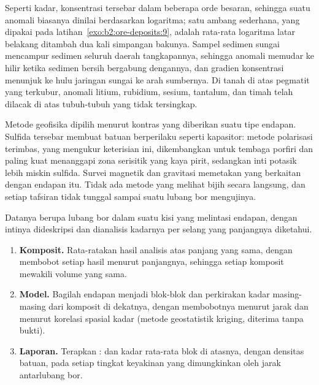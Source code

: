 Seperti kadar, konsentrasi tersebar dalam beberapa orde besaran, sehingga suatu anomali biasanya dinilai berdasarkan
logaritma; satu ambang sederhana, yang dipakai pada latihan~\ref{exo:b2:ore-deposits:9}, adalah rata-rata
logaritma latar belakang ditambah dua kali simpangan bakunya. Sampel sedimen sungai
mencampur sedimen seluruh daerah tangkapannya, sehingga anomali memudar ke hilir ketika sedimen bersih bergabung
dengannya, dan gradien konsentrasi menunjuk ke hulu jaringan sungai ke arah sumbernya. Di tanah di atas
pegmatit yang terkubur, anomali litium, rubidium, sesium, tantalum, dan timah telah dilacak di atas
tubuh-tubuh yang tidak tersingkap.

Metode geofisika dipilih menurut kontras yang diberikan suatu tipe endapan. Sulfida tersebar membuat
batuan berperilaku seperti kapasitor: metode polarisasi terimbas, yang mengukur keterisian ini, dikembangkan
untuk tembaga porfiri dan paling kuat menanggapi zona serisitik yang kaya pirit, sedangkan inti
potasik lebih miskin sulfida. Survei magnetik dan gravitasi memetakan  yang berkaitan dengan
endapan itu. Tidak ada metode yang melihat bijih
secara langsung, dan setiap tafsiran tidak tunggal sampai suatu lubang bor mengujinya.

\begin{method}\label{met:b2:ore-deposits:resource}
Datanya berupa lubang bor dalam suatu kisi yang melintasi endapan, dengan intinya dideskripsi dan dianalisis kadarnya per selang
yang panjangnya diketahui.
\begin{enumerate}
  \item \textbf{Komposit.} Rata-ratakan hasil analisis atas panjang yang sama, dengan membobot setiap hasil menurut
        panjangnya, sehingga setiap komposit mewakili volume yang sama.
  \item \textbf{Model.} Bagilah endapan menjadi blok-blok dan perkirakan kadar masing-masing dari
        komposit di dekatnya, dengan membobotnya menurut jarak dan menurut korelasi spasial kadar
        (metode geostatistik kriging, diterima tanpa bukti).
  \item \textbf{Laporan.} Terapkan :  dan kadar rata-rata blok di atasnya, dengan
        densitas batuan, pada setiap tingkat keyakinan yang dimungkinkan oleh jarak antarlubang bor.
\end{enumerate}
\end{method}

